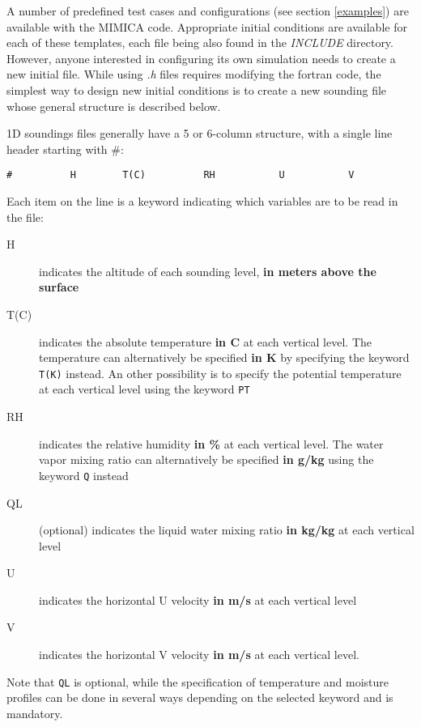 \documentclass[12pt,A4,french]{article}
\begin{document}
A number of predefined test cases and configurations (see section  \ref{examples}) are available with the MIMICA code. Appropriate initial conditions are available for each of these templates, each file being also found in the {\it INCLUDE} directory. However, anyone interested in configuring its own simulation needs to create a new initial file. While using {\it .h} files requires modifying the fortran code, the simplest way to design new initial conditions is to create a new sounding file whose general structure is described below.
 
1D soundings files generally have a 5 or 6-column structure, with a single line header starting with \#:
\begin{verbatim}
#          H        T(C)          RH           U           V
\end{verbatim}
Each item on the line is a keyword indicating which variables are to be read in the file:
\begin{description}
\item[H] indicates the altitude of each sounding level, {\bf in meters above the surface}
\item[T(C)] indicates the absolute temperature {\bf in C} at each vertical level. The temperature can alternatively be specified {\bf in K} by specifying the keyword \verb?T(K)? instead. An other possibility is to specify the potential temperature at each vertical level using the keyword \verb?PT?
\item[RH] indicates the relative humidity {\bf in \%} at each vertical level. The water vapor mixing ratio can alternatively be specified {\bf in g/kg} using the keyword \verb?Q? instead
\item[QL] (optional) indicates the liquid water mixing ratio {\bf in kg/kg} at each vertical level
\item[U] indicates the horizontal U velocity {\bf in m/s} at each vertical level
\item[V] indicates the horizontal V velocity {\bf in m/s} at each vertical level.
\end{description}
Note that \verb?QL? is optional, while the specification of temperature and moisture profiles can be done in several ways depending on the selected keyword and is mandatory. 
\end{document}
